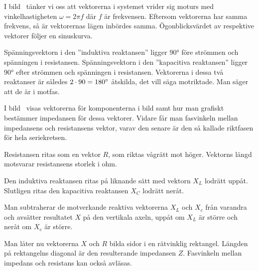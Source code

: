 I bild~ tänker vi oss att vektorerna i systemet vrider
sig moturs med vinkelhastigheten \(\omega = 2\pi f\) där \(f\) är frekvensen.
Eftersom vektorerna har samma frekvens, så är vektorernas lägen inbördes samma.
Ögonblicksvärdet av respektive vektorer följer en sinuskurva.

Spänningsvektorn i den ''induktiva reaktansen'' ligger \ang{90} före strömmen
och spänningen i resistansen.
Spänningsvektorn i den ''kapacitiva reaktansen'' ligger \ang{90} efter
strömmen och spänningen i resistansen.
Vektorerna i dessa två reaktanser är således \(2 \cdot 90 = 180\degree\)
åtskilda, det vill säga motriktade.
Man säger att de är i motfas.


I bild~ visas vektorerna för komponenterna i bild
 samt hur man grafiskt bestämmer impedansen för dessa
vektorer.
Vidare får man fasvinkeln mellan impedansens och resistansens vektor, varav den
senare är den så kallade riktfasen för hela seriekretsen.

Resistansen ritas som en vektor \(R\), som riktas vågrätt mot höger.
Vektorns längd motsvarar resistansens storlek i ohm.

Den induktiva reaktansen ritas på liknande sätt med vektorn \(X_L\) lodrätt
uppåt.
Slutligen ritas den kapacitiva reaktansen \(X_C\) lodrätt neråt.

Man subtraherar de motverkande reaktiva vektorerna \(X_L\) och \(X_c\) från
varandra och avsätter resultatet \(X\) på den vertikala axeln, uppåt om \(X_L\)
är större och neråt om \(X_c\) är större.

Man låter nu vektorerna \(X\) och \(R\) bilda sidor i en rätvinklig rektangel.
Längden på rektangelns diagonal är den resulterande impedansen \(Z\).
Fasvinkeln mellan impedans och resistans kan också avläsas.

